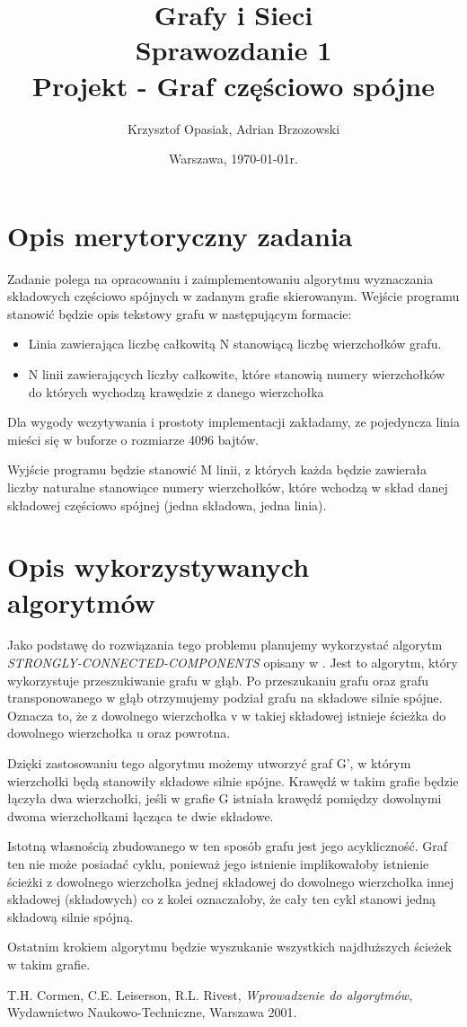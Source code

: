 \documentclass[a4paper,10pt]{article}
\title{{\textbf{Grafy i Sieci}}\\[1ex]
       {\Large Sprawozdanie 1}\\[-1ex]
       {\Large Projekt - Graf częściowo spójne}}
\author{Krzysztof Opasiak, Adrian Brzozowski}
\date{Warszawa, \today r.}
\begin{document}
\maketitle

\section{Opis merytoryczny zadania}

Zadanie polega na opracowaniu i zaimplementowaniu algorytmu
wyznaczania składowych częściowo spójnych w zadanym grafie
skierowanym. Wejście programu stanowić będzie opis tekstowy grafu w
następującym formacie:

\begin{itemize}
\item Linia zawierająca liczbę całkowitą N stanowiącą liczbę wierzchołków grafu.
\item N linii zawierających liczby całkowite, które stanowią numery
  wierzchołków do których wychodzą krawędzie z danego wierzchołka
\end{itemize}

Dla wygody wczytywania i prostoty implementacji zakładamy, ze
pojedyncza linia mieści się w buforze o rozmiarze 4096 bajtów.

Wyjście programu będzie stanowić M linii, z których każda będzie
zawierała liczby naturalne stanowiące numery wierzchołków, które
wchodzą w skład danej składowej częściowo spójnej (jedna składowa,
jedna linia).

\section{Opis wykorzystywanych algorytmów}

Jako podstawę do rozwiązania tego problemu planujemy wykorzystać
algorytm {\it STRONGLY-CONNECTED-COMPONENTS} opisany w
\cite[rozdz. 23.5]{Cormen}. Jest to algorytm, który wykorzystuje przeszukiwanie
grafu w głąb. Po przeszukaniu grafu oraz grafu transponowanego w głąb
otrzymujemy podział grafu na składowe silnie spójne. Oznacza to, że z
dowolnego wierzchołka v w takiej składowej istnieje ścieżka do
dowolnego wierzchołka u oraz powrotna.

Dzięki zastosowaniu tego algorytmu możemy utworzyć graf G', w którym
wierzchołki będą stanowiły składowe silnie spójne. Krawędź w takim
grafie będzie łączyła dwa wierzchołki, jeśli w grafie G istniała
krawędź pomiędzy dowolnymi dwoma wierzchołkami łącząca te dwie składowe.

Istotną własnością zbudowanego w ten sposób grafu jest jego
acykliczność. Graf ten nie może posiadać cyklu, ponieważ jego
istnienie implikowałoby istnienie ścieżki z dowolnego wierzchołka
jednej składowej do dowolnego wierzchołka innej składowej (składowych)
co z kolei oznaczałoby, że cały ten cykl stanowi jedną składową silnie
spójną.

Ostatnim krokiem algorytmu będzie wyszukanie wszystkich najdłuższych
ścieżek w takim grafie.

\begin{thebibliography}{9}
 T.H. Cormen, C.E. Leiserson, R.L. Rivest, \emph{Wprowadzenie do algorytmów}, Wydawnictwo Naukowo-Techniczne, Warszawa 2001.
\end{thebibliography}
\end{document}
